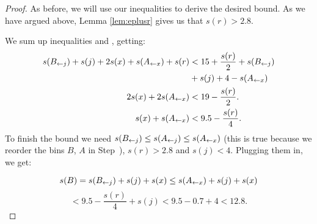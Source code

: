 \begin{proof}
As before, we will use our inequalities to derive the desired
bound. As we have argued above, Lemma \ref{lem:eplusr} gives us that
$s(r) > 2.8$.

We sum up inequalities  and , getting:
\begin{align*}
 s(B_{\leftarrow j}) + s(j) + 2s(x) + s(A_{\leftarrow x}) + s(r) &< 15 + \frac{s(r)}{2} + s(B_{\leftarrow j})\\
&+ s(j) + 4 - s(A_{\leftarrow x})\\ 
2s(x) + 2s(A_{\leftarrow x}) &< 19 - \frac{s(r)}{2}. \\
s(x) + s(A_{\leftarrow x}) &< 9.5 - \frac{s(r)}{4}. 
\end{align*}
To finish the bound we need $s(B_{\leftarrow j}) \le s(A_{\leftarrow j}) \le s(A_{\leftarrow x})$ (this is true because we reorder the bins
$B$, $A$ in Step~), $s(r) > 2.8$ and $s(j) < 4$. Plugging them in, we get:

\[ s(B) = s(B_{\leftarrow j}) + s(j) + s(x) \le s(A_{\leftarrow x}) + s(j) + s(x) \]
\[ < 9.5 - \frac{s(r)}{4} + s(j) < 9.5 - 0.7 + 4 < 12.8. \]
\end{proof}
